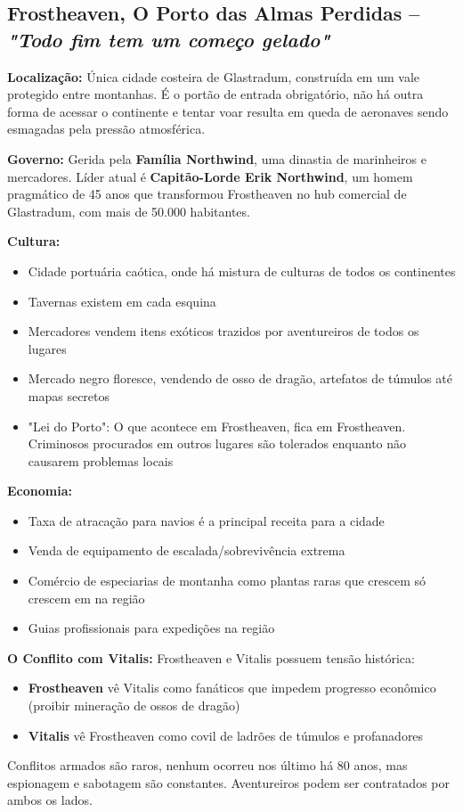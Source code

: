 \subsection*{Frostheaven, O Porto das Almas Perdidas – \textit{"Todo fim tem um começo gelado"}}

\textbf{\ringmfamily Localização:} Única cidade costeira de Glastradum, construída em um vale protegido entre montanhas. É o portão de entrada obrigatório, não há outra forma de acessar o continente e tentar voar resulta em queda de aeronaves sendo esmagadas pela pressão atmosférica.

\textbf{\ringmfamily Governo:} Gerida pela \textbf{Família Northwind}, uma dinastia de marinheiros e mercadores. Líder atual é \textbf{Capitão-Lorde Erik Northwind}, um homem pragmático de 45 anos que transformou Frostheaven no hub comercial de Glastradum, com mais de 50.000 habitantes.

\textbf{\ringmfamily Cultura:}
\begin{itemize}
    \item Cidade portuária caótica, onde há mistura de culturas de todos os continentes
    \item Tavernas existem em cada esquina 
    \item Mercadores vendem itens exóticos trazidos por aventureiros de todos os lugares
    \item Mercado negro floresce, vendendo de osso de dragão, artefatos de túmulos até mapas secretos
    \item "Lei do Porto": O que acontece em Frostheaven, fica em Frostheaven. Criminosos procurados em outros lugares são tolerados enquanto não causarem problemas locais
\end{itemize}

\textbf{\ringmfamily Economia:}
\begin{itemize}
    \item Taxa de atracação para navios é a principal receita para a cidade
    \item Venda de equipamento de escalada/sobrevivência extrema
    \item Comércio de especiarias de montanha como plantas raras que crescem só crescem em na região
    \item Guias profissionais para expedições na região
\end{itemize}

\textbf{\ringmfamily O Conflito com Vitalis:}
Frostheaven e Vitalis possuem tensão histórica:
\begin{itemize}
    \item \textbf{Frostheaven} vê Vitalis como fanáticos que impedem progresso econômico (proibir mineração de ossos de dragão)
    \item \textbf{Vitalis} vê Frostheaven como covil de ladrões de túmulos e profanadores
\end{itemize}
Conflitos armados são raros, nenhum ocorreu nos último há 80 anos, mas espionagem e sabotagem são constantes. Aventureiros podem ser contratados por ambos os lados.


